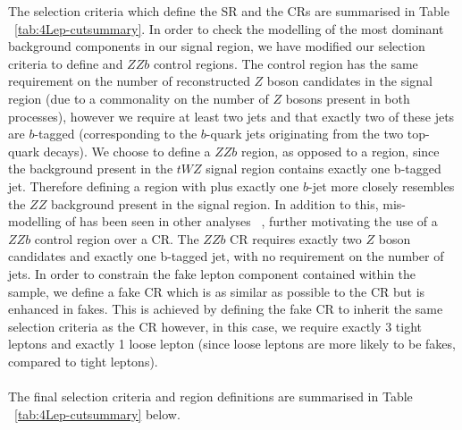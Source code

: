 The selection criteria which define the SR and the CRs are summarised in Table ~\ref{tab:4Lep-cutsummary}. In order to check the modelling of the most dominant background components in our signal region, we have modified our selection criteria to define \ttZ and $ZZb$ control regions. The \ttZ control region has the same requirement on the number of reconstructed $Z$ boson candidates in the signal region (due to a commonality on the number of $Z$ bosons present in both processes), however we require at least two jets and that exactly two of these jets are $b$-tagged (corresponding to the $b$-quark jets originating from the two top-quark decays). We choose to define a $ZZb$ region, as opposed to a \ZZ region, since the \ZZ background present in the $tWZ$ signal region contains exactly one b-tagged jet. Therefore defining a region with \ZZ plus exactly one $b$-jet more closely resembles the $ZZ$ background present in the signal region. In addition to this, mis-modelling of \ZZ has been seen in other analyses ~\cite{Aaboud:2019, ppToZZ:CMSpaper}, further motivating the use of a $ZZb$ control region over a \ZZ CR. The $ZZb$ CR requires exactly two $Z$ boson candidates and exactly one b-tagged jet, with no requirement on the number of jets. In order to constrain the fake lepton component contained within the \ttZ sample, we define a \ttZ fake CR which is as similar as possible to the \ttZ CR but is enhanced in fakes. This is achieved by defining the \ttZ fake CR to inherit the same selection criteria as the \ttZ CR however, in this case, we require exactly 3 tight leptons and exactly 1 loose lepton (since loose leptons are more likely to be fakes, compared to tight leptons).\\\\
 The final selection criteria and region definitions are summarised in Table ~\ref{tab:4Lep-cutsummary} below.




